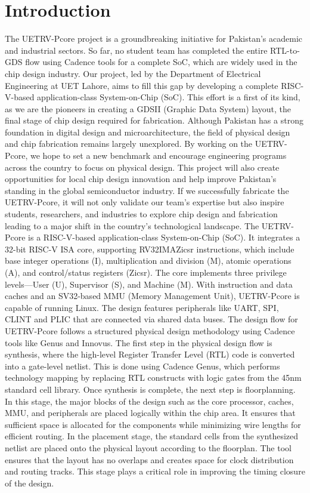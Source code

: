 
\chapter{Introduction}
\label{Chapter1}

The UETRV-Pcore project is a groundbreaking initiative for Pakistan's academic and industrial sectors. So far, no student team has completed the entire RTL-to-GDS flow using Cadence tools for a complete SoC, which are widely used in the chip design industry. Our project, led by the Department of Electrical Engineering at UET Lahore, aims to fill this gap by developing a complete RISC-V-based application-class System-on-Chip (SoC). This effort is a first of its kind, as we are the pioneers in creating a GDSII (Graphic Data System) layout, the final stage of chip design required for fabrication.
Although Pakistan has a strong foundation in digital design and microarchitecture, the field of physical design and chip fabrication remains largely unexplored. By working on the UETRV-Pcore, we hope to set a new benchmark and encourage engineering programs across the country to focus on physical design. This project will also create opportunities for local chip design innovation and help improve Pakistan’s standing in the global semiconductor industry. If we successfully fabricate the UETRV-Pcore, it will not only validate our team’s expertise but also inspire students, researchers, and industries to explore chip design and fabrication leading to a major shift in the country’s technological landscape.
The UETRV-Pcore is a RISC-V-based application-class System-on-Chip (SoC). It integrates a 32-bit RISC-V ISA core, supporting RV32IMAZicsr instructions, which include base integer operations (I), multiplication and division (M), atomic operations (A), and control/status registers (Zicsr). The core implements three privilege levels—User (U), Supervisor (S), and Machine (M). With instruction and data caches and an SV32-based MMU (Memory Management Unit), UETRV-Pcore is capable of running Linux. The design features peripherals like UART, SPI, CLINT and PLIC that are connected via shared data buses. The design flow for UETRV-Pcore follows a structured physical design methodology using Cadence tools like Genus and Innovus. 
The first step in the physical design flow is synthesis, where the high-level Register Transfer Level (RTL) code is converted into a gate-level netlist. This is done using Cadence Genus, which performs technology mapping by replacing RTL constructs with logic gates from the 45nm standard cell library. Once synthesis is complete, the next step is floorplanning. In this stage, the major blocks of the design such as the core processor, caches, MMU, and peripherals are  placed logically within the chip area. It ensures that sufficient space is allocated for the components while minimizing wire lengths for efficient routing. In the placement stage, the standard cells from the synthesized netlist are placed onto the physical layout according to the floorplan. The tool ensures that the layout has no overlaps and creates space for clock distribution and routing tracks. This stage plays a critical role in improving the timing closure of the design. 
